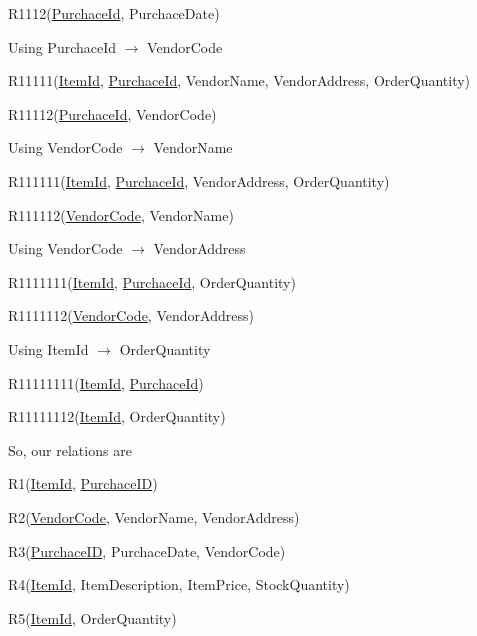 \documentclass[12pt]{article}
\begin{document}
\begin{enumerate}
\begin{enumerate}
\hspace{10mm} R1112(\underline{PurchaceId}, PurchaceDate)

\vskip 12pt

Using PurchaceId $\rightarrow$ VendorCode

\hspace{10mm} R11111(\underline{ItemId}, \underline{PurchaceId}, VendorName, VendorAddress, OrderQuantity)

\hspace{10mm} R11112(\underline{PurchaceId}, VendorCode)

\vskip 12pt

Using VendorCode $\rightarrow$ VendorName

\hspace{10mm} R111111(\underline{ItemId}, \underline{PurchaceId}, VendorAddress, OrderQuantity)

\hspace{10mm} R111112(\underline{VendorCode}, VendorName)

\vskip 12pt

Using VendorCode $\rightarrow$ VendorAddress

\hspace{10mm} R1111111(\underline{ItemId}, \underline{PurchaceId}, OrderQuantity)

\hspace{10mm} R1111112(\underline{VendorCode}, VendorAddress)

\vskip 12pt

Using ItemId $\rightarrow$ OrderQuantity

\hspace{10mm} R11111111(\underline{ItemId}, \underline{PurchaceId})

\hspace{10mm} R11111112(\underline{ItemId}, OrderQuantity)

\vskip 12pt

So, our relations are 

R1(\underline{ItemId}, \underline{PurchaceID})

R2(\underline{VendorCode}, VendorName, VendorAddress)

R3(\underline{PurchaceID}, PurchaceDate, VendorCode)

R4(\underline{ItemId}, ItemDescription, ItemPrice, StockQuantity)

R5(\underline{ItemId}, OrderQuantity)


\end{enumerate}
\end{enumerate}
\end{document}
